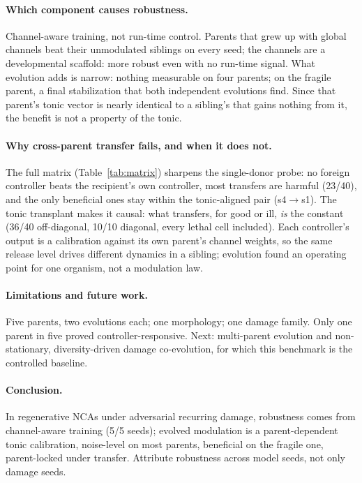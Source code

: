 \documentclass{article}
\begin{document}
\paragraph{Which component causes robustness.}
Channel-aware training, not run-time control. Parents that grew up with
global channels beat their unmodulated siblings on every seed; the
channels are a developmental scaffold: more robust even with no
run-time signal. What evolution adds is
narrow: nothing measurable on four parents; on the fragile parent, a
final stabilization that both independent evolutions find. Since that
parent's tonic vector is nearly identical to a sibling's that gains
nothing from it, the benefit is not a property of the tonic.
\paragraph{Why cross-parent transfer fails, and when it does not.}
The full matrix (Table~\ref{tab:matrix}) sharpens the single-donor
probe: no foreign controller beats the recipient's own controller, most
transfers are harmful (23/40), and the only beneficial ones stay within
the tonic-aligned pair (s4$\to$s1).
The tonic transplant makes it causal: what transfers, for good or ill,
\emph{is} the constant (36/40 off-diagonal, 10/10 diagonal, every lethal
cell included). Each controller's output is a
calibration against its own parent's channel weights, so the same
release level drives different dynamics in a sibling; evolution found an
operating point for one organism, not a modulation law.

\paragraph{Limitations and future work.}
Five parents, two evolutions each; one morphology; one damage family.
Only one parent in five proved controller-responsive. Next: multi-parent
evolution and non-stationary, diversity-driven damage co-evolution, for which this benchmark is the controlled baseline.

\paragraph{Conclusion.}\label{sec:conclusion}
In regenerative NCAs under adversarial recurring damage, robustness comes
from channel-aware training (5/5 seeds); evolved modulation is a
parent-dependent tonic calibration, noise-level on most parents,
beneficial on the fragile one, parent-locked under transfer. Attribute
robustness across model seeds, not only damage seeds.
\end{document}
